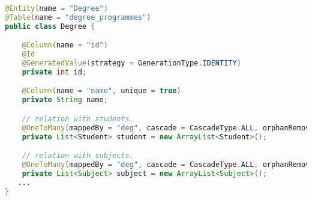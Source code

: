 \begin{lstlisting}[language=Java,  basicstyle=\footnotesize]
@Entity(name = "Degree")
@Table(name = "degree_programmes")
public class Degree {

	@Column(name = "id")
	@Id
	@GeneratedValue(strategy = GenerationType.IDENTITY)
	private int id;

	@Column(name = "name", unique = true)
	private String name;

	// relation with students.
	@OneToMany(mappedBy = "deg", cascade = CascadeType.ALL, orphanRemoval = true)
	private List<Student> student = new ArrayList<Student>();

	// relation with subjects.
	@OneToMany(mappedBy = "deg", cascade = CascadeType.ALL, orphanRemoval = true)
	private List<Subject> subject = new ArrayList<Subject>();
   ...
}
\end{lstlisting}